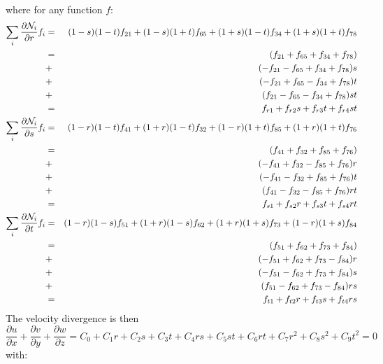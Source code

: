 where for any function $f$:
\begin{eqnarray}
\sum_i
\frac{\partial {\mathcal{N}}_i}{\partial r} f_i 
&=&
 (1-s)(1-t)f_{21}
+(1-s)(1+t)f_{65}
+(1+s)(1-t)f_{34}
+(1+s)(1+t)f_{78} 
\nonumber\\
&=& ( f_{21}+f_{65}+f_{34}+f_{78}) \nonumber\\
&+& (-f_{21}-f_{65}+f_{34}+f_{78})s \nonumber\\
&+& (-f_{21}+f_{65}-f_{34}+f_{78})t \nonumber\\
&+& ( f_{21}-f_{65}-f_{34}+f_{78})st 
\nonumber\\
&=& f_{r1} + f_{r2}s + f_{r3}t + f_{r4} st \nonumber\\ 
\sum_i
\frac{\partial {\mathcal{N}}_i}{\partial s} f_i 
&=&
 (1-r)(1-t)f_{41}
+(1+r)(1-t)f_{32}
+(1-r)(1+t)f_{85}
+(1+r)(1+t)f_{76} \nonumber\\
&=&
   ( f_{41}+f_{32}+f_{85}+f_{76})  \nonumber\\
&+&(-f_{41}+f_{32}-f_{85}+f_{76})r \nonumber\\
&+&(-f_{41}-f_{32}+f_{85}+f_{76})t \nonumber\\
&+&( f_{41}-f_{32}-f_{85}+f_{76})rt
\nonumber\\
&=& f_{s1} + f_{s2}r + f_{s3}t + f_{s4} rt \nonumber\\ 
\sum_i
\frac{\partial {\mathcal{N}}_i}{\partial t} f_i 
&=&
 (1-r)(1-s)f_{51}
+(1+r)(1-s)f_{62}
+(1+r)(1+s)f_{73}
+(1-r)(1+s)f_{84} \nonumber\\
&=&( f_{51}+f_{62}+f_{73}+f_{84}) \nonumber\\ 
&+&(-f_{51}+f_{62}+f_{73}-f_{84})r\nonumber\\
&+&(-f_{51}-f_{62}+f_{73}+f_{84})s\nonumber\\
&+&( f_{51}-f_{62}+f_{73}-f_{84})rs
\nonumber\\
&=& f_{t1} + f_{t2}r + f_{t3}s + f_{t4} rs \nonumber
\end{eqnarray}
The velocity divergence is then 
\[
 \frac{\partial u}{\partial x} 
+\frac{\partial v}{\partial y} 
+\frac{\partial w}{\partial z} 
= C_0 +C_1 r + C_2 s + C_3 t + C_4 rs + C_5 st + C_6 rt + C_7r^2 + C_8 s^2 + C_9 t ^2 =0
\]
with:
